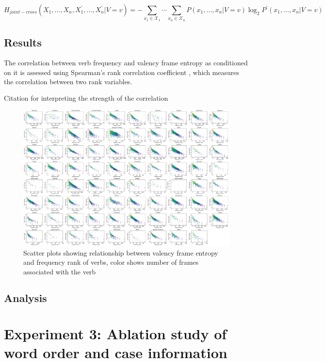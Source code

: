 $$
H_{joint-cross}(X_{1},\ldots,X_{n},X_{1}^{\prime},\ldots,X_{n}^{\prime}|V=v)=
-\sum\limits_{x_1\in{}\mathcal{X}_1}\cdots\sum\limits_{x_n\in{}\mathcal{X}_n}{P(x_1,\ldots,x_{n}|V=v)\log_{2}P^{\prime}(x_1,\ldots,x_n|V=v)}
$$

\subsection{Results}

The correlation between verb frequency and valency frame entropy as conditioned on it is assessed using Spearman's rank correlation coefficient \citep{spearman1904}, which measures the correlation between two rank variables. 

Citation for interpreting the strength of the correlation \citep{schober2018}

\begin{figure}
  \centering
  \includegraphics[width=\textwidth]{figures/joint_entropy_freq.pdf}
  \caption{Scatter plots showing relationship between valency frame entropy and frequency rank of verbs, color shows number of frames associated with the verb}
  \label{fig:joint_entropy_freq}
\end{figure}

\subsection{Analysis}

\section{Experiment 3: Ablation study of word order and case information}
